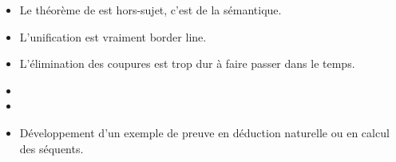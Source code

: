 \documentclass{agregfiche}
\begin{document}
\secdev

\begin{itemize}
\item Le théorème de  est hors-sujet, c'est de la sémantique.
\item L'unification est vraiment border line.
\item L'élimination des coupures est trop dur à faire passer dans le temps.
\item 
\item 
\item Développement d'un exemple de preuve en déduction naturelle ou en calcul des séquents.
\end{itemize}
\end{document}
